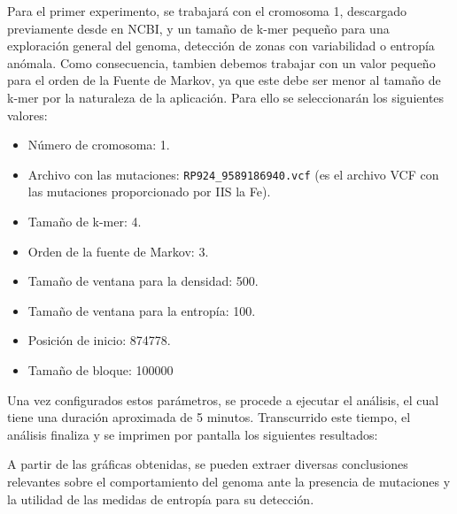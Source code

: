 \documentclass[11pt,spanish,listoffigures,listoftables]{tfgetsinf}
\begin{document}
Para el primer experimento, se trabajará con el cromosoma 1, descargado previamente desde en \ac{NCBI}, y un tamaño de k-mer pequeño para una exploración general del genoma, detección de zonas con variabilidad o entropía anómala. Como consecuencia, tambien debemos trabajar con un valor pequeño para el orden de la Fuente de Markov, ya que este debe ser menor al tamaño de k-mer por la naturaleza de la aplicación. Para ello se seleccionarán los siguientes valores:


\begin{itemize}
   \item Número de cromosoma: 1.
   \item Archivo con las mutaciones: \texttt{RP924\_9589186940.vcf}  (es el archivo \ac{VCF} con las mutaciones proporcionado por \ac{IIS} la Fe).
   \item Tamaño de k-mer: 4.
   \item Orden de la fuente de Markov: 3.
   \item Tamaño de ventana para la densidad: 500.
   \item Tamaño de ventana para la entropía: 100.
   \item Posición de inicio: 874778.
   \item Tamaño de bloque: 100000 
\end{itemize}
 

Una vez configurados estos parámetros, se procede a ejecutar el análisis, el cual tiene una duración aproximada de 5 minutos. Transcurrido este tiempo, el análisis finaliza y se imprimen por pantalla los siguientes resultados:

A partir de las gráficas obtenidas, se pueden extraer diversas conclusiones relevantes sobre el comportamiento del genoma ante la presencia de mutaciones y la utilidad de las medidas de entropía para su detección.  
\end{document}
